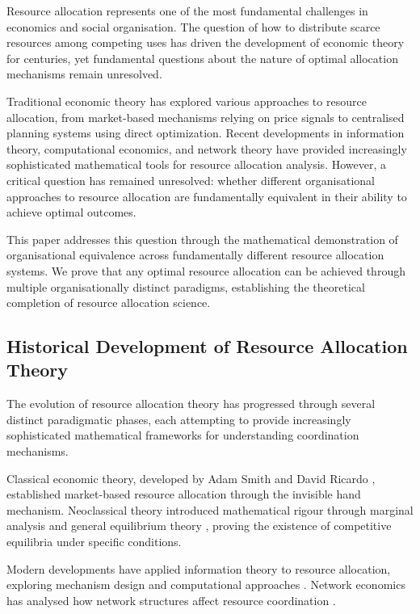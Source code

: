 \documentclass[12pt,a4paper]{article}
\begin{document}
Resource allocation represents one of the most fundamental challenges in economics and social organisation. The question of how to distribute scarce resources among competing uses has driven the development of economic theory for centuries, yet fundamental questions about the nature of optimal allocation mechanisms remain unresolved.

Traditional economic theory has explored various approaches to resource allocation, from market-based mechanisms relying on price signals to centralised planning systems using direct optimization. Recent developments in information theory, computational economics, and network theory have provided increasingly sophisticated mathematical tools for resource allocation analysis. However, a critical question has remained unresolved: whether different organisational approaches to resource allocation are fundamentally equivalent in their ability to achieve optimal outcomes.

This paper addresses this question through the mathematical demonstration of organisational equivalence across fundamentally different resource allocation systems. We prove that any optimal resource allocation can be achieved through multiple organisationally distinct paradigms, establishing the theoretical completion of resource allocation science.

\subsection{Historical Development of Resource Allocation Theory}

The evolution of resource allocation theory has progressed through several distinct paradigmatic phases, each attempting to provide increasingly sophisticated mathematical frameworks for understanding coordination mechanisms.

Classical economic theory, developed by Adam Smith \cite{smith1776} and David Ricardo \cite{ricardo1817}, established market-based resource allocation through the invisible hand mechanism. Neoclassical theory introduced mathematical rigour through marginal analysis and general equilibrium theory \cite{marshall1890,walras1874,pareto1906}, proving the existence of competitive equilibria under specific conditions.

Modern developments have applied information theory \cite{shannon1948,cover1991} to resource allocation, exploring mechanism design \cite{myerson1991} and computational approaches \cite{holland1992}. Network economics has analysed how network structures affect resource coordination \cite{jackson2008,acemoglu2012}.
\end{document}
